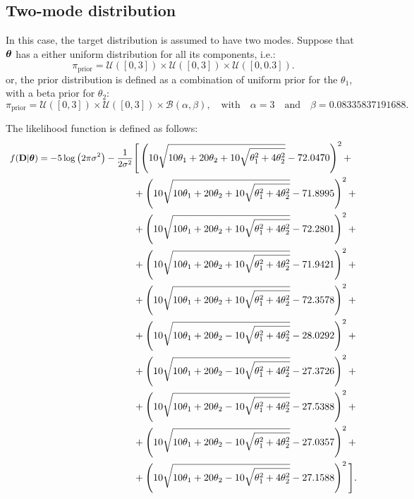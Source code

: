\subsection{Two-mode distribution}

In this case, the target distribution is assumed to have two modes.
Suppose that $\mbox{\boldmath$ \theta $}$ has a either uniform distribution for all its components, i.e.:
$$
\pi_{\text{prior}}=\mathcal{U}([0,3]) \times \mathcal{U}([0,3]) \times \mathcal{U}([0,0.3]).
$$
or, the prior distribution is defined as a combination of uniform prior for the $\theta_1$, with a beta prior for $\theta_2$:
$$
\pi_{\text{prior}}=\mathcal{U}([0,3]) \times \mathcal{U}([0,3]) \times \mathcal{B}(\alpha,\beta), \quad \text{with} \quad \alpha=3 \quad\text{and}\quad \beta=0.08335837191688.
$$

The likelihood function is defined as follows:
\begin{equation}
\begin{split}\small
f({\bf D}|\mbox{\boldmath$ \theta $})=  -5 \log\left(2 \pi \sigma^2\right)- \dfrac{1}{2\sigma^2} &\Bigg[ 
  \left(10 \sqrt{10 \theta_1+20 \theta_2+10 \sqrt{\theta_1^2+4 \theta_2^2}}-72.0470\right)^2+\\
&+\left(10 \sqrt{10 \theta_1+20 \theta_2+10 \sqrt{\theta_1^2+4 \theta_2^2}}-71.8995\right)^2+\\
&+\left(10 \sqrt{10 \theta_1+20 \theta_2+10 \sqrt{\theta_1^2+4 \theta_2^2}}-72.2801\right)^2+\\
&+\left(10 \sqrt{10 \theta_1+20 \theta_2+10 \sqrt{\theta_1^2+4 \theta_2^2}}-71.9421\right)^2+\\
&+\left(10 \sqrt{10 \theta_1+20 \theta_2+10 \sqrt{\theta_1^2+4 \theta_2^2}}-72.3578\right)^2+\\
&+\left(10 \sqrt{10 \theta_1+20 \theta_2-10 \sqrt{\theta_1^2+4 \theta_2^2}}-28.0292\right)^2+\\
&+\left(10 \sqrt{10 \theta_1+20 \theta_2-10 \sqrt{\theta_1^2+4 \theta_2^2}}-27.3726\right)^2+\\
&+\left(10 \sqrt{10 \theta_1+20 \theta_2-10 \sqrt{\theta_1^2+4 \theta_2^2}}-27.5388\right)^2+\\
&+\left(10 \sqrt{10 \theta_1+20 \theta_2-10 \sqrt{\theta_1^2+4 \theta_2^2}}-27.0357\right)^2+\\
&+\left(10 \sqrt{10 \theta_1+20 \theta_2-10 \sqrt{\theta_1^2+4 \theta_2^2}}-27.1588\right)^2 \Bigg].
\end{split} 
\end{equation}




